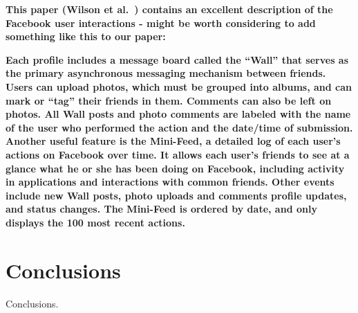 \documentclass[letterpaper]{article}
\begin{document}
\textbf{This paper (Wilson et al.~\cite{wilson2009user}) contains an excellent description of the Facebook user interactions - might be worth considering to add something like this to our paper:}


\textbf{Each profile includes a message board called the “Wall” that serves as the primary asynchronous messaging mechanism between friends. Users can upload photos, which must be grouped into albums, and can mark or “tag” their friends in them. Comments can also be left on photos. All Wall posts and photo comments are labeled with the name of the user who performed the action and the date/time of submission. Another useful feature is the Mini-Feed, a detailed log of each user’s actions on Facebook over time. It allows each user’s friends to see at a glance what he or she has been doing on Facebook, including activity in applications and interactions with common friends. Other events include new Wall posts, photo uploads and comments profile updates, and status changes. The Mini-Feed is ordered by date, and only displays the 100 most recent actions.}


\section{Conclusions}


Conclusions.




\end{document}
